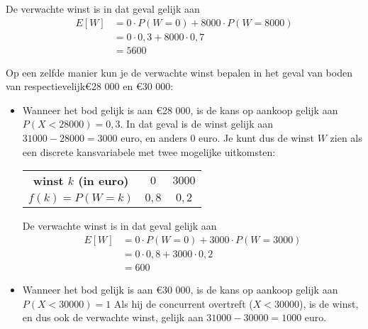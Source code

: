\begin{enumerate}[label=(\alph*)]
{        De verwachte winst is in dat geval gelijk aan 
        \begin{align*}
            E[W]    &= 0 \cdot P(W=0) + 8 000 \cdot P(W = 8 000) \\
                    &= 0 \cdot 0,3 + 8 000 \cdot 0,7 \\
                    &= 5 600
        \end{align*}

        Op een zelfde manier kun je de verwachte winst bepalen in het geval van boden van respectievelijk\euro 28 000 en \euro 30 000:
        \begin{itemize}
            \item Wanneer het bod gelijk is aan \euro 28 000, is de kans op aankoop gelijk aan $P(X<28 000) = 0,3$.
            In dat geval is de winst gelijk aan $31 000 - 28 000 = 3 000$ euro, en anders $0$ euro. 
            Je kunt dus de winst $W$ zien als een discrete kansvariabele met twee mogelijke uitkomsten:
            \begin{center}
                \begin{tabular}{ccc}
                    \toprule
                        {\bfseries winst $k$ (in euro)} & $0$ & $3 000$\\
                    \cmidrule{1-1} \cmidrule{2-2} \cmidrule{3-3}
                        {\bfseries $f(k)=P(W=k)$} & $0,8$ & $0,2$ \\
                    \bottomrule
                \end{tabular}
            \end{center}
            De verwachte winst is in dat geval gelijk aan 
            \begin{align*}
                E[W]    &= 0 \cdot P(W=0) + 3 000 \cdot P(W = 3 000) \\
                        &= 0 \cdot 0,8 + 3 000 \cdot 0,2 \\
                        &= 600
            \end{align*}
            
            \item Wanneer het bod gelijk is aan \euro 30 000, is de kans op aankoop gelijk aan $P(X<30 000) = 1$
            Als hij de concurrent overtreft ($X < 30 000$), is de winst, en dus ook de verwachte winst, gelijk aan $31 000 - 30 000 = 1 000$ euro.
        \end{itemize}
    }


\end{enumerate}
